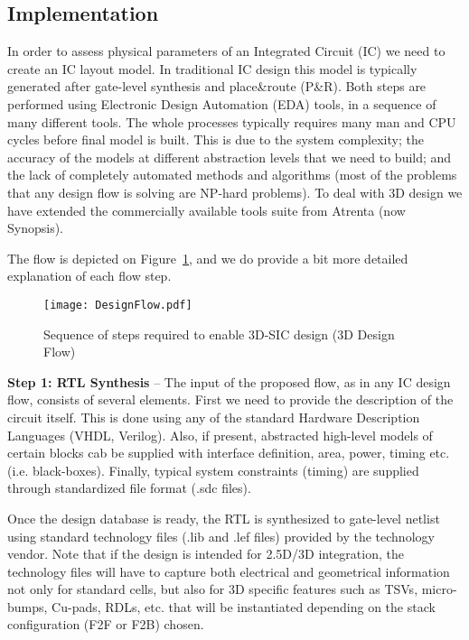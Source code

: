 \subsection*{Implementation}
In order to assess physical parameters of an Integrated Circuit (IC) we need to create an IC layout model. In traditional IC design this model is typically generated after gate-level synthesis and place\&route (P\&R). Both steps are performed using Electronic Design Automation (EDA) tools, in a sequence of many different tools. The whole processes typically requires many man and CPU cycles before final model is built. This is due to the system complexity; the accuracy of the models at different abstraction levels that we need to build; and the lack of completely automated methods and algorithms (most of the problems that any design flow is solving are NP-hard problems). To deal with 3D design we have extended the commercially available tools suite from Atrenta (now Synopsis).

The flow is depicted on Figure~\ref{fig:3DFlow}, and we do provide a bit more detailed explanation of each flow step.

\begin{figure}[h!]%
\centering
\texttt{[image: DesignFlow.pdf]}
\caption{Sequence of steps required to enable 3D-SIC design (3D Design Flow)\label{fig:3DFlow}}
\end{figure}

\textbf{Step 1: RTL Synthesis} – The input of the proposed flow, as in any IC design flow, consists of several elements. First we need to provide the description of the circuit itself. This is done using any of the standard Hardware Description Languages (VHDL, Verilog). Also, if present, abstracted high-level models of certain blocks cab be supplied with interface definition, area, power, timing etc. (i.e. black-boxes). Finally, typical system constraints (timing) are supplied through standardized file format (.sdc files).

Once the design database is ready, the RTL is synthesized to gate-level netlist using standard technology files (.lib and .lef files) provided by the technology vendor. Note that if the design is intended for 2.5D/3D integration, the technology files will have to capture both electrical and geometrical information not only for standard cells, but also for 3D specific features such as TSVs, micro-bumps, Cu-pads, RDLs, etc. that will be instantiated depending on the stack configuration (F2F or F2B) chosen.


